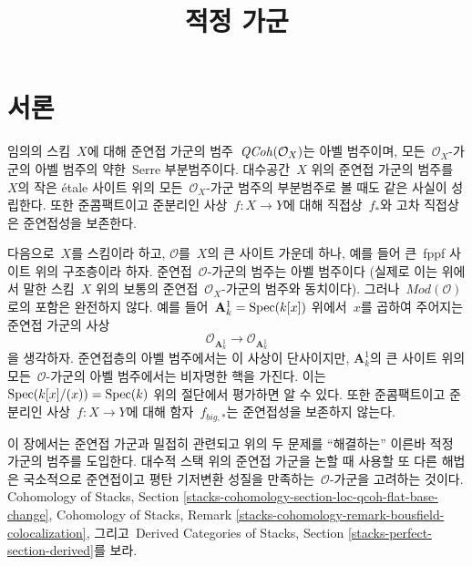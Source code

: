 

%


\title{적정 가군}


\maketitle

\label{section-phantom}

\tableofcontents

\section{서론}
\label{section-introduction}

\noindent
임의의 스킴\  $X$에 대해 준연접 가군의 범주\ 
$\mathit{QCoh}(\mathcal{O}_X)$는 아벨 범주이며, 모든\ 
$\mathcal{O}_X$-가군의 아벨 범주의 약한\  Serre 부분범주이다.
대수공간\  $X$ 위의 준연접 가군의 범주를\  $X$의 작은 \'etale
사이트 위의 모든\  $\mathcal{O}_X$-가군 범주의 부분범주로 볼 때도
같은 사실이 성립한다. 또한 준콤팩트이고 준분리인 사상\ 
$f : X \to Y$에 대해 직접상\  $f_*$와 고차 직접상은 준연접성을
보존한다.

\medskip\noindent
다음으로\  $X$를 스킴이라 하고, $\mathcal{O}$를\  $X$의 큰 사이트
가운데 하나, 예를 들어 큰\  fppf 사이트 위의 구조층이라 하자.
준연접\  $\mathcal{O}$-가군의 범주는 아벨 범주이다
(실제로 이는 위에서 말한 스킴\  $X$ 위의 보통의 준연접\ 
$\mathcal{O}_X$-가군의 범주와 동치이다). 그러나\ 
$\textit{Mod}(\mathcal{O})$로의 포함은 완전하지 않다.
예를 들어\  $\mathbf{A}^1_k = \mathop{\mathrm{Spec}}(k[x])$ 위에서\  $x$를 곱하여
주어지는 준연접 가군의 사상
$$
\mathcal{O}_{\mathbf{A}^1_k}
\longrightarrow
\mathcal{O}_{\mathbf{A}^1_k}
$$
을 생각하자. 준연접층의 아벨 범주에서는 이 사상이 단사이지만,
$\mathbf{A}^1_k$의 큰 사이트 위의 모든\  $\mathcal{O}$-가군의
아벨 범주에서는 비자명한 핵을 가진다. 이는\ 
$\mathop{\mathrm{Spec}}(k[x]/(x)) = \mathop{\mathrm{Spec}}(k)$ 위의 절단에서 평가하면 알 수 있다.
또한 준콤팩트이고 준분리인 사상\  $f : X \to Y$에 대해 함자\ 
$f_{big, *}$는 준연접성을 보존하지 않는다.

\medskip\noindent
이 장에서는 준연접 가군과 밀접히 관련되고 위의 두 문제를
“해결하는” 이른바 적정 가군의 범주를 도입한다. 대수적 스택
위의 준연접 가군을 논할 때 사용할 또 다른 해법은 국소적으로
준연접이고 평탄 기저변환 성질을 만족하는\  $\mathcal{O}$-가군을
고려하는 것이다. Cohomology of Stacks, Section
\ref{stacks-cohomology-section-loc-qcoh-flat-base-change},
Cohomology of Stacks, Remark
\ref{stacks-cohomology-remark-bousfield-colocalization}, 그리고\ 
Derived Categories of Stacks, Section
\ref{stacks-perfect-section-derived}를 보라.






